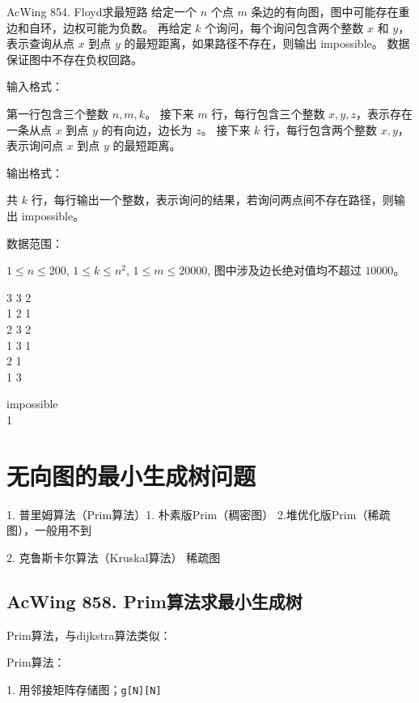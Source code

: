 \begin{titledbox}{AcWing 854. Floyd求最短路}
    给定一个 $n$ 个点 $m$ 条边的有向图，图中可能存在重边和自环，边权可能为负数。 再给定 $k$ 个询问，每个询问包含两个整数 $x$ 和 $y$，表示查询从点 $x$ 到点 $y$ 的最短距离，如果路径不存在，则输出 impossible。 数据保证图中不存在负权回路。

    输入格式：

    第一行包含三个整数 $n,m,k$。 接下来 $m$ 行，每行包含三个整数 $x,y,z$，表示存在一条从点 $x$ 到点 $y$ 的有向边，边长为 $z$。 接下来 $k$ 行，每行包含两个整数 $x,y$，表示询问点 $x$ 到点 $y$ 的最短距离。

    输出格式：

    共 $k$ 行，每行输出一个整数，表示询问的结果，若询问两点间不存在路径，则输出 impossible。

    数据范围：

    $1 \le n \le 200$, $1 \le k \le n^2$, $1 \le m \le 20000$, 图中涉及边长绝对值均不超过 $10000$。

    \begin{inputblock}
        3 3 2 \\
        1 2 1 \\
        2 3 2 \\
        1 3 1 \\
        2 1 \\
        1 3
    \end{inputblock}
    \begin{outputblock}
        impossible \\
        1
    \end{outputblock}
\end{titledbox}


\section{无向图的最小生成树问题}

1. 普里姆算法（Prim算法）1. 朴素版Prim（稠密图） 2.堆优化版Prim（稀疏图），一般用不到

2. 克鲁斯卡尔算法（Kruskal算法） 稀疏图

\subsection{AcWing 858. Prim算法求最小生成树}
Prim算法，与dijkstra算法类似：

Prim算法：

1. 用邻接矩阵存储图；\lstinline{g[N][N]}

